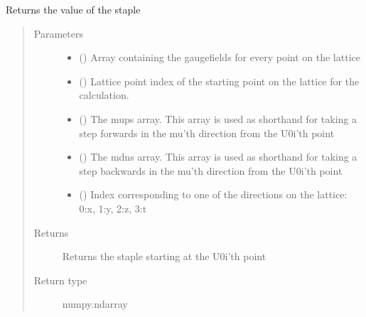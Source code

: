 \documentclass[letterpaper,10pt,english]{sphinxmanual}
\begin{document}
\begin{fulllineitems}
\label{\detokenize{index:su2.getstaple}}
Returns the value of the staple
\begin{quote}\begin{description}
\item[{Parameters}] \leavevmode\begin{itemize}
\item {} 
 () \textendash{} Array containing the gaugefields for every point on the lattice

\item {} 
 () \textendash{} Lattice point index of the starting point on the lattice for
the calculation.

\item {} 
 () \textendash{} The mups array. This array is used as shorthand for taking a
step forwards in the mu’th direction from the U0i’th point

\item {} 
 () \textendash{} The mdns array. This array is used as shorthand for taking a
step backwards in the mu’th direction from the U0i’th point

\item {} 
 () \textendash{} Index corresponding to one of the directions on the lattice:
0:x, 1:y, 2:z, 3:t

\end{itemize}

\item[{Returns}] \leavevmode
Returns the staple starting at the U0i’th point

\item[{Return type}] \leavevmode
numpy.ndarray

\end{description}\end{quote}

\end{fulllineitems}
\end{document}
